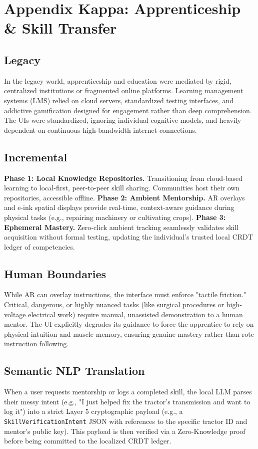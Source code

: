 \chapter{Appendix Kappa: Apprenticeship \\\& Skill Transfer}

\section{Legacy}
In the legacy world, apprenticeship and education were mediated by rigid, centralized institutions or fragmented online platforms. Learning management systems (LMS) relied on cloud servers, standardized testing interfaces, and addictive gamification designed for engagement rather than deep comprehension. The UIs were standardized, ignoring individual cognitive models, and heavily dependent on continuous high-bandwidth internet connections.

\section{Incremental}
\textbf{Phase 1: Local Knowledge Repositories.} Transitioning from cloud-based learning to local-first, peer-to-peer skill sharing. Communities host their own repositories, accessible offline.
\textbf{Phase 2: Ambient Mentorship.} AR overlays and e-ink spatial displays provide real-time, context-aware guidance during physical tasks (e.g., repairing machinery or cultivating crops).
\textbf{Phase 3: Ephemeral Mastery.} Zero-click ambient tracking seamlessly validates skill acquisition without formal testing, updating the individual's trusted local CRDT ledger of competencies.

\section{Human Boundaries}
While AR can overlay instructions, the interface must enforce "tactile friction." Critical, dangerous, or highly nuanced tasks (like surgical procedures or high-voltage electrical work) require manual, unassisted demonstration to a human mentor. The UI explicitly degrades its guidance to force the apprentice to rely on physical intuition and muscle memory, ensuring genuine mastery rather than rote instruction following.

\section{Semantic NLP Translation}
When a user requests mentorship or logs a completed skill, the local LLM parses their messy intent (e.g., "I just helped fix the tractor's transmission and want to log it") into a strict Layer 5 cryptographic payload (e.g., a \texttt{SkillVerificationIntent} JSON with references to the specific tractor ID and mentor's public key). This payload is then verified via a Zero-Knowledge proof before being committed to the localized CRDT ledger.

